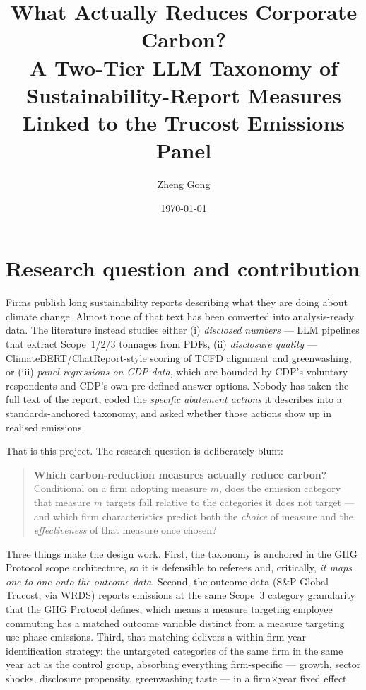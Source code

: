 \documentclass[11pt]{article}
\title{\textbf{What Actually Reduces Corporate Carbon?}\\[0.3em]
\large A Two-Tier LLM Taxonomy of Sustainability-Report Measures\\
Linked to the Trucost Emissions Panel}
\author{Zheng Gong}
\date{\today}
\begin{document}
\maketitle
\vspace{-1.5em}

\section{Research question and contribution}

Firms publish long sustainability reports describing what they are doing about
climate change. Almost none of that text has been converted into
analysis-ready data. The literature instead studies either (i) \emph{disclosed
numbers} --- LLM pipelines that extract Scope~1/2/3 tonnages from PDFs, (ii)
\emph{disclosure quality} --- ClimateBERT/ChatReport-style scoring of TCFD
alignment and greenwashing, or (iii) \emph{panel regressions on CDP data},
which are bounded by CDP's voluntary respondents and CDP's own pre-defined
answer options. Nobody has taken the full text of the report, coded the
\emph{specific abatement actions} it describes into a standards-anchored
taxonomy, and asked whether those actions show up in realised emissions.

That is this project. The research question is deliberately blunt:

\begin{quote}
\textbf{Which carbon-reduction measures actually reduce carbon?} Conditional
on a firm adopting measure $m$, does the emission category that measure $m$
targets fall relative to the categories it does not target --- and which firm
characteristics predict both the \emph{choice} of measure and the
\emph{effectiveness} of that measure once chosen?
\end{quote}

Three things make the design work. First, the taxonomy is anchored in the GHG
Protocol scope architecture, so it is defensible to referees and, critically,
\emph{it maps one-to-one onto the outcome data}. Second, the outcome data
(S\&P Global Trucost, via WRDS) reports emissions at the same Scope~3 category
granularity that the GHG Protocol defines, which means a measure targeting
employee commuting has a matched outcome variable distinct from a measure
targeting use-phase emissions. Third, that matching delivers a
within-firm-year identification strategy: the untargeted categories of the
same firm in the same year act as the control group, absorbing everything
firm-specific --- growth, sector shocks, disclosure propensity, greenwashing
taste --- in a firm$\times$year fixed effect.
\end{document}
